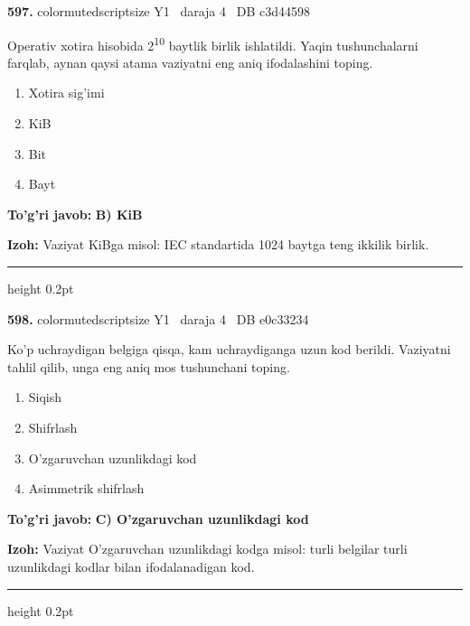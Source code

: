 \documentclass[10pt,a4paper,oneside]{article}
\begin{document}
\noindent\textbf{\color{ink}597.}  {color{muted}scriptsize Y1 \textbullet\ daraja 4 \textbullet\ DB c3d44598}
\par
Operativ xotira hisobida 2\textsuperscript{1}\textsuperscript{0} baytlik birlik ishlatildi. Yaqin tushunchalarni farqlab, aynan qaysi atama vaziyatni eng aniq ifodalashini toping.
\begin{enumerate}[label=\Alph*),leftmargin=9mm]
\item Xotira sig'imi
\item KiB
\item Bit
\item Bayt
\end{enumerate}
\begin{tcolorbox}[enhanced,breakable,colback=teal!4,colframe=teal!50!black,boxrule=0.5pt,arc=1.1mm,left=3mm,right=3mm,top=1.7mm,bottom=1.7mm,before skip=2mm,after skip=2mm]
\textbf{\color{teal}To'g'ri javob:} \textbf{B) KiB}
\par\smallskip
\textbf{Izoh:} Vaziyat KiBga misol: IEC standartida 1024 baytga teng ikkilik birlik.
\end{tcolorbox}
\vspace{2mm}\hrule height 0.2pt \vspace{3mm}

\noindent\textbf{\color{ink}598.}  {color{muted}scriptsize Y1 \textbullet\ daraja 4 \textbullet\ DB e0c33234}
\par
Ko'p uchraydigan belgiga qisqa, kam uchraydiganga uzun kod berildi. Vaziyatni tahlil qilib, unga eng aniq mos tushunchani toping.
\begin{enumerate}[label=\Alph*),leftmargin=9mm]
\item Siqish
\item Shifrlash
\item O'zgaruvchan uzunlikdagi kod
\item Asimmetrik shifrlash
\end{enumerate}
\begin{tcolorbox}[enhanced,breakable,colback=teal!4,colframe=teal!50!black,boxrule=0.5pt,arc=1.1mm,left=3mm,right=3mm,top=1.7mm,bottom=1.7mm,before skip=2mm,after skip=2mm]
\textbf{\color{teal}To'g'ri javob:} \textbf{C) O'zgaruvchan uzunlikdagi kod}
\par\smallskip
\textbf{Izoh:} Vaziyat O'zgaruvchan uzunlikdagi kodga misol: turli belgilar turli uzunlikdagi kodlar bilan ifodalanadigan kod.
\end{tcolorbox}
\vspace{2mm}\hrule height 0.2pt \vspace{3mm}
\end{document}
